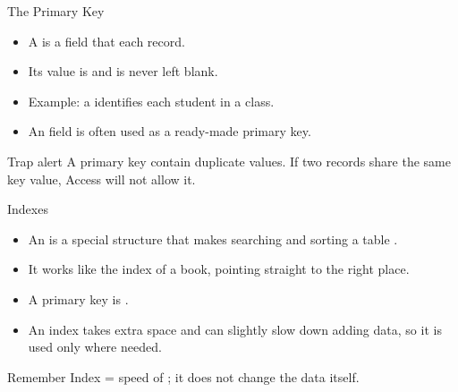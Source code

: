 \documentclass[aspectratio=169]{beamer}
\begin{document}
\begin{frame}{The Primary Key}
  \begin{itemize}
    \item A  is a field that  each
      record.
    \item Its value is  and is never left
      blank.
    \item Example: a  identifies each student in a class.
    \item An  field is often used as a ready-made primary
      key.
  \end{itemize}
  \begin{alertblock}{Trap alert}
    A primary key  contain duplicate values. If two records share
    the same key value, Access will not allow it.
  \end{alertblock}
\end{frame}

\begin{frame}{Indexes}
  \begin{itemize}
    \item An  is a special structure that makes searching and
      sorting a table .
    \item It works like the index of a book, pointing straight to the right
      place.
    \item A primary key is .
    \item An index takes extra space and can slightly slow down adding data,
      so it is used only where needed.
  \end{itemize}
  \begin{block}{Remember}
    Index = speed of ; it does not change the data itself.
  \end{block}
\end{frame}
\end{document}
